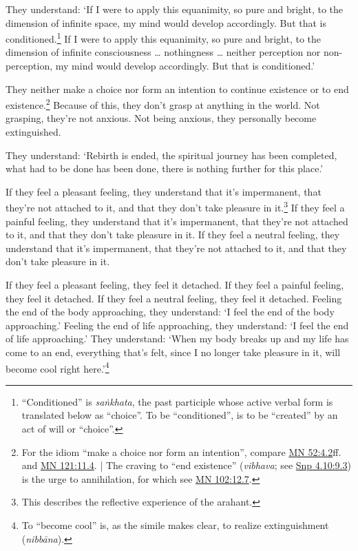 \documentclass[12pt,openany]{book}%
\begin{document}
They understand: ‘If I were to apply this equanimity, so pure and bright, to the dimension of infinite space, my mind would develop accordingly. But that is conditioned.\footnote{“Conditioned” is \textit{\textsanskrit{saṅkhata}}, the past participle whose active verbal form is translated below as “choice”. To be “conditioned”, is to be “created” by an act of will or “choice”. } If I were to apply this equanimity, so pure and bright, to the dimension of infinite consciousness … nothingness … neither perception nor non-perception, my mind would develop accordingly. But that is conditioned.’ 

They neither make a choice nor form an intention to continue existence or to end existence.\footnote{For the idiom “make a choice nor form an intention”, compare \href{https://suttacentral.net/mn52/en/sujato\#4.2}{MN 52:4.2}ff. and \href{https://suttacentral.net/mn121/en/sujato\#11.4}{MN 121:11.4}. | The craving to “end existence” (\textit{vibhava}; see \href{https://suttacentral.net/snp4.10/en/sujato\#9.3}{Snp 4.10:9.3}) is the urge to annihilation, for which see \href{https://suttacentral.net/mn102/en/sujato\#12.7}{MN 102:12.7}. } Because of this, they don’t grasp at anything in the world. Not grasping, they’re not anxious. Not being anxious, they personally become extinguished. 

They understand: ‘Rebirth is ended, the spiritual journey has been completed, what had to be done has been done, there is nothing further for this place.’ 

If they feel a pleasant feeling, they understand that it’s impermanent, that they’re not attached to it, and that they don’t take pleasure in it.\footnote{This describes the reflective experience of the arahant. } If they feel a painful feeling, they understand that it’s impermanent, that they’re not attached to it, and that they don’t take pleasure in it. If they feel a neutral feeling, they understand that it’s impermanent, that they’re not attached to it, and that they don’t take pleasure in it. 

If they feel a pleasant feeling, they feel it detached. If they feel a painful feeling, they feel it detached. If they feel a neutral feeling, they feel it detached. Feeling the end of the body approaching, they understand: ‘I feel the end of the body approaching.’ Feeling the end of life approaching, they understand: ‘I feel the end of life approaching.’ They understand: ‘When my body breaks up and my life has come to an end, everything that’s felt, since I no longer take pleasure in it, will become cool right here.’\footnote{To “become cool” is, as the simile makes clear, to realize extinguishment (\textit{\textsanskrit{nibbāna}}). } 
\end{document}
